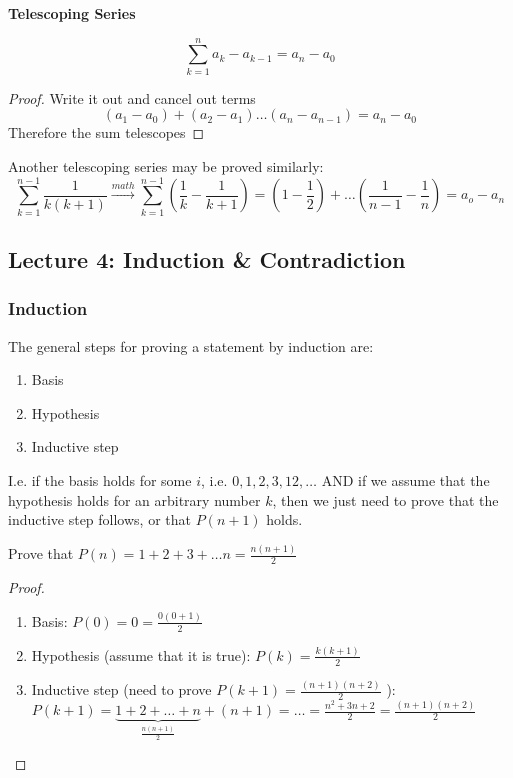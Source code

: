 \documentclass[10pt]{article}
\begin{document}
\textbf{Telescoping Series} 

\begin{equation}
	\sum_{k=1}^{n} a_k - a_{k-1} = a_n - a_0
\end{equation}

\begin{proof}
	Write it out and cancel out terms
	\begin{equation}
		(a_1 - a_0) + (a_2 - a_1) \ldots (a_n - a_{n-1}) = a_n - a_0
	\end{equation}
	Therefore the sum telescopes
\end{proof}


Another telescoping series may be proved similarly:
\begin{equation}
	\sum^{n-1}_{k=1} \frac{1}{k(k+1)} \xrightarrow{math} \sum^{n-1}_{k=1} (\frac{1}{k} - \frac{1}{k+1}) 
	= 
	(1- \frac{1}{2}) + \ldots (\frac{1}{n-1} - \frac{1}{n}) = a_o - a_n
\end{equation}


\subsection{Lecture 4: Induction \& Contradiction}


\subsubsection{Induction}

The general steps for proving a statement by induction are:
\begin{enumerate}
	\item Basis
	\item Hypothesis
	\item Inductive step
\end{enumerate}

I.e. if the basis holds for some $ i $, i.e. $ 0, 1, 2, 3, 12, \ldots$ AND if we assume that the hypothesis holds for an arbitrary number $ k $, then we just need to prove that the inductive step follows, or that $ P(n+1) $ holds.

\begin{example}
	Prove that $ P(n) = 1+2+3+\ldots n = \frac{n(n+1)}{2} $ 
	\begin{proof}
		
	

	\begin{enumerate}
		\item Basis: $ P(0) = 0 = \frac{0(0+1)}{2} $
		\item Hypothesis (assume that it is true): $ P(k) = \frac{k(k+1)}{2} $
	\item Inductive step (need to prove $ P(k+1) = \frac{(n+1)(n+2)}{2} $ ): $ P(k+1) = \underbrace{1+2+\ldots+n}_{\frac{n(n+1)}{2}} + (n+1) = \ldots = \frac{n^2 + 3n + 2}{2} = \frac{(n+1)(n+2)}{2} $
	\end{enumerate}

	\end{proof}
	
\end{example}
\end{document}
